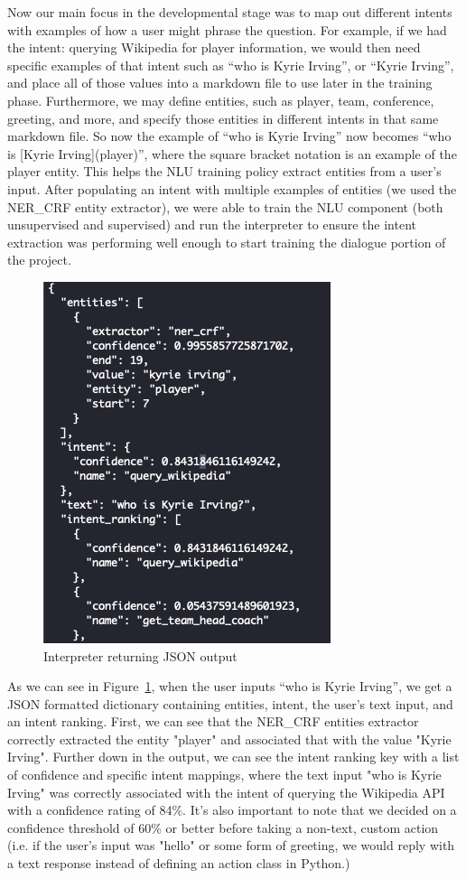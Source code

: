 \documentclass[conference]{IEEEtran}
\begin{document}
Now our main focus in the developmental stage was to map out different intents with examples of how a user might phrase the question. For example, if we had the intent: querying Wikipedia for player information, we would then need specific examples of that intent such as “who is Kyrie Irving”, or “Kyrie Irving”, and place all of those values into a markdown file to use later in the training phase. Furthermore, we may define entities, such as player, team, conference, greeting, and more, and specify those entities in different intents in that same markdown file. So now the example of “who is Kyrie Irving” now becomes “who is [Kyrie Irving](player)”, where the square bracket notation is an example of the player entity. This helps the NLU training policy extract entities from a user's input. After populating an intent with multiple examples of entities (we used the NER\_CRF entity extractor), we were able to train the NLU component (both unsupervised and supervised) and run the interpreter to ensure the intent extraction was performing well enough to start training the dialogue portion of the project. 

\begin{figure}[!htb]
	\centering
	\includegraphics[scale=0.60]{nlu_example.png}
	\caption{ Interpreter returning JSON output }
	\label{fig:ex2}
\end{figure}

As we can see in Figure~\ref{fig:ex2}, when the user inputs “who is Kyrie Irving”, we get a JSON formatted dictionary containing entities, intent, the user's text input, and an intent ranking. First, we can see that the NER\_CRF entities extractor correctly extracted the entity "player" and associated that with the value "Kyrie Irving". Further down in the output, we can see the intent ranking key with a list of confidence and specific intent mappings, where the text input "who is Kyrie Irving" was correctly associated with the intent of querying the Wikipedia API with a confidence rating of 84\%. It's also important to note that we decided on a confidence threshold of 60\% or better before taking a non-text, custom action (i.e. if the user's input was "hello" or some form of greeting, we would reply with a text response instead of defining an action class in Python.)
\end{document}
